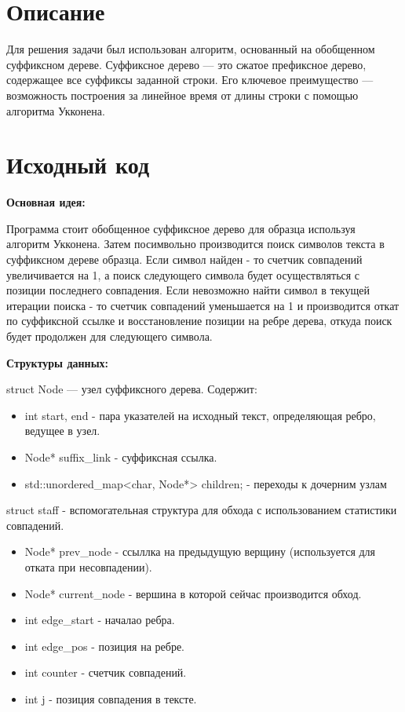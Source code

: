\section{Описание}
Для решения задачи был использован алгоритм, основанный на обобщенном суффиксном дереве. 
Суффиксное дерево — это сжатое префиксное дерево, содержащее
все суффиксы заданной строки. Его ключевое преимущество — 
возможность построения за линейное время от длины строки с помощью алгоритма Укконена.

\section{Исходный код}
{\bfseries Основная идея:}

Программа стоит обобщенное суффиксное дерево для образца используя алгоритм Укконена. Затем посимвольно производится поиск символов текста в суффиксном дереве образца. Если символ найден - то счетчик совпадений увеличивается на 1, а поиск следующего символа будет осуществляться с позиции последнего совпадения.
Если невозможно найти символ в текущей итерации поиска - то счетчик совпадений уменьшается на 1 и производится откат по суффиксной ссылке и восстановление позиции на ребре дерева, откуда поиск будет продолжен для следующего символа.

{\bfseries Структуры данных:}

struct Node — узел суффиксного дерева. Содержит:

\begin{itemize}
    \item int start, end - пара указателей на исходный текст, определяющая
ребро, ведущее в узел.
    \item Node* suffix\_link - суффиксная ссылка.
    \item std::unordered\_map<char, Node*> children; - переходы к дочерним узлам
\end{itemize}


struct staff - вспомогательная структура для обхода с использованием статистики совпадений.
\begin{itemize}
    \item Node* prev\_node - ссыллка на предыдущую верщину (используется для отката при несовпадении).
    \item Node* current\_node - вершина в которой сейчас производится обход.
    \item int edge\_start - началао ребра.
    \item int edge\_pos - позиция на ребре.
    \item int counter - счетчик совпадений.
    \item int j - позиция совпадения в тексте.
\end{itemize}

